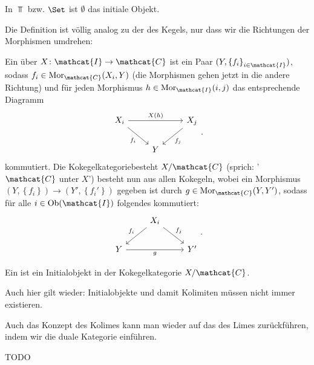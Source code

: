 \begin{example}
    In $\Top$ bzw.  $\Set$ ist  $\emptyset$ das initiale Objekt.
\end{example}

\begin{definition}[Kokegelkategorie]\label{def:kokegelkategorie}
    Die Definition ist völlig analog zu der des Kegels, nur dass wir die Richtungen der Morphismen umdrehen:


    Ein  über $X\colon  \mathcat{I} \to  \mathcat{C}$ ist ein Paar $(Y, \left \{f_i\right\} _{i\in \mathcat{I}})$, sodass $f_i \in  \Mor_{\mathcat{C}}(X_i, Y)$ (die Morphismen gehen jetzt in die andere Richtung) und für jeden Morphismus $h\in \Mor_{\mathcat{I}}(i,j)$ das entsprechende Diagramm
    \[
    \begin{tikzcd}
        X_i \ar{rr}{X(h)} \ar[swap]{dr}{f_i} & & X_j \ar{dl}{f_j} \\
         & Y
    \end{tikzcd}
    .\] 
    kommutiert. Die Kokegelkategoriebesteht $X / \mathcat{C}$ (sprich: '$\mathcat{C}$ unter $X$') besteht nun aus allen Kokegeln, wobei ein Morphismus $(Y, \left \{f_i\right\} ) \to  (Y', \left \{f_i'\right\} )$ gegeben ist durch $g\in \Mor_{\mathcat{C}}(Y,Y')$, sodass für alle $i\in \Ob(\mathcat{I})$ folgendes kommutiert:
    \[
        \begin{tikzcd}
    & X_i \ar[swap]{dl}{f_i} \ar{dr}{f_j} \\
            Y \ar[swap]{rr}{g}& & Y'
        \end{tikzcd}
    .\] 
\end{definition}

\begin{definition}[Kolimes]\label{def:kolimes}
Ein  ist ein Initialobjekt in der Kokegelkategorie $X / \mathcat{C}$. 
\end{definition}

\begin{warning}
    Auch hier gilt wieder: Initialobjekte und damit Kolimiten müssen nicht immer existieren.
\end{warning}

\begin{oral}
    Auch das Konzept des Kolimes kann man wieder auf das des Limes zurückführen, indem wir die duale Kategorie einführen.
\end{oral}

\begin{lemma**}
    TODO
\end{lemma**}


